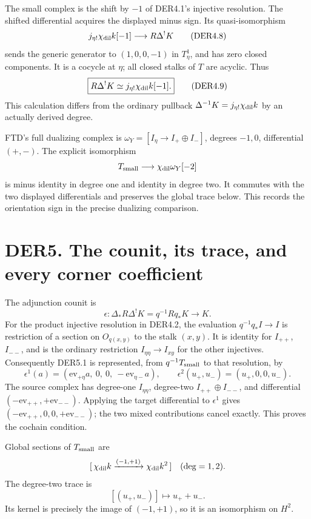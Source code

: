 The small complex is the shift by \(-1\) of DER4.1's injective
resolution. The shifted differential acquires the displayed minus sign.
Its quasi-isomorphism \[
j_{\eta!}\chi_{\rm dil}k[-1]\longrightarrow
R\Delta^!K
\tag{DER4.8}
\] sends the generic generator to \((1,0,0,-1)\) in \(T^1_\eta\), and
has zero closed components. It is a cocycle at \(\eta\); all closed
stalks of \(T\) are acyclic. Thus \[
\boxed{R\Delta^!K\simeq j_{\eta!}\chi_{\rm dil}k[-1].}
\tag{DER4.9}
\] This calculation differs from the ordinary pullback
\(\Delta^{-1}K=j_{\eta!}\chi_{\rm dil}k\) by an actually derived degree.

FTD's full dualizing complex is \(\omega_Y=[I_\eta\to I_+\oplus I_-]\),
degrees \(-1,0\), differential \((+,-)\). The explicit isomorphism \[
T_{\rm small}\longrightarrow\chi_{\rm dil}\omega_Y[-2]
\] is minus identity in degree one and identity in degree two. It
commutes with the two displayed differentials and preserves the global
trace below. This records the orientation sign in the precise dualizing
comparison.

\section{DER5. The counit, its trace, and every corner
coefficient}\label{der5.-the-counit-its-trace-and-every-corner-coefficient}

The adjunction counit is \[
\epsilon:\Delta_*R\Delta^!K=q^{-1}Rq_*K\longrightarrow K.
\tag{DER5.1}
\] For the product injective resolution in DER4.2, the evaluation
\(q^{-1}q_*I\to I\) is restriction of a section on \(O_{q(x,y)}\) to the
stalk \((x,y)\). It is identity for \(I_{++}\), \(I_{--}\), and is the
ordinary restriction \(I_{\eta\eta}\to I_{xy}\) for the other
injectives. Consequently DER5.1 is represented, from
\(q^{-1}T_{\rm small}\) to that resolution, by \[
\epsilon^1(a)=
(\mathrm{ev}_{+\eta}a,\ 0,\ 0,\ -\mathrm{ev}_{\eta-}a),
\qquad
\epsilon^2(u_+,u_-)=(u_+,0,0,u_-).
\tag{DER5.2}
\] The source complex has degree-one \(I_{\eta\eta}\), degree-two
\(I_{++}\oplus I_{--}\), and differential
\((-\mathrm{ev}_{++},+\mathrm{ev}_{--})\). Applying the target
differential to \(\epsilon^1\) gives
\((-\mathrm{ev}_{++},0,0,+\mathrm{ev}_{--})\); the two mixed
contributions cancel exactly. This proves the cochain condition.

Global sections of \(T_{\rm small}\) are \[
[\,\chi_{\rm dil}k\xrightarrow{(-1,+1)}
 \chi_{\rm dil}k^2\,]\quad(\deg=1,2).
\] The degree-two trace is \[
[(u_+,u_-)]\longmapsto u_++u_-.
\tag{DER5.3}
\] Its kernel is precisely the image of \((-1,+1)\), so it is an
isomorphism on \(H^2\).

